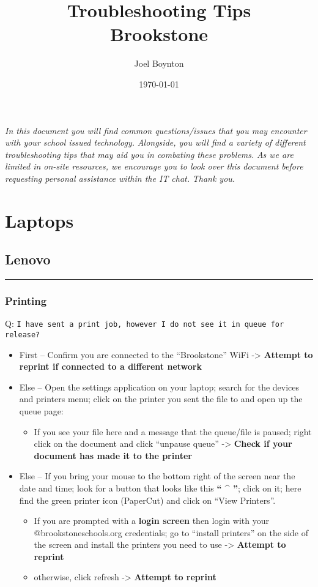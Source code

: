 \documentclass[11pt]{article}
\author{Joel Boynton}
\date{\today}
\title{Troubleshooting Tips\\\medskip
\large Brookstone}
\begin{document}
\maketitle
\begin{center}
\emph{In this document you will find common questions/issues that you may encounter with your school issued technology.}
\emph{Alongside, you will find a variety of different troubleshooting tips that may aid you in combating these problems.}
\emph{As we are limited in on-site resources, we encourage you to look over this document before requesting personal assistance within the IT chat.}
\emph{Thank you.}
\end{center}
\tableofcontents \clearpage
\section{Laptops}
\label{sec:org6911c13}
\subsection{Lenovo}
\label{sec:org937fd9a}
\noindent\rule{\textwidth}{0.5pt}
\subsubsection{Printing}
\label{sec:org802f848}
Q: \texttt{I have sent a print job, however I do not see it in queue for release?}
\begin{itemize}
\item First -- Confirm you are connected to the ``Brookstone'' WiFi -> \textbf{Attempt to reprint if connected to a different network}
\item Else -- Open the settings application on your laptop; search for the devices and printers menu; click on the printer you sent the file to and open up the queue page:
\begin{itemize}
\item If you see your file here and a message that the queue/file is paused; right click on the document and click ``unpause queue'' -> \textbf{Check if your document has made it to the printer}
\end{itemize}

\item Else -- If you bring your mouse to the bottom right of the screen near the date and time; look for a button that looks like this \textbf{`` \^{} ''}; click on it; here find the green printer icon (PaperCut) and click on ``View Printers''.
\begin{itemize}
\item If you are prompted with a \textbf{login screen} then login with your @brookstoneschools.org credentials; go to ``install printers'' on the side of the screen and install the printers you need to use -> \textbf{Attempt to reprint}
\item otherwise, click refresh -> \textbf{Attempt to reprint}
\end{itemize}
\end{itemize}
\end{document}
